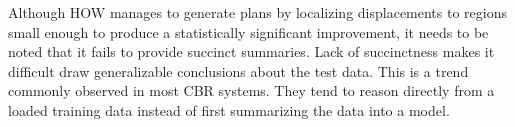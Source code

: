 \documentclass{sig-alternate}
\begin{document}
Although HOW manages to generate plans by localizing displacements to regions small enough to produce a statistically significant improvement, it needs to be noted that it fails to provide succinct summaries. Lack of succinctness makes it difficult draw generalizable conclusions about the test data. This is a trend commonly observed in most CBR systems. They tend to reason directly from a loaded training data instead of first summarizing the data into a model. 

\end{document}
